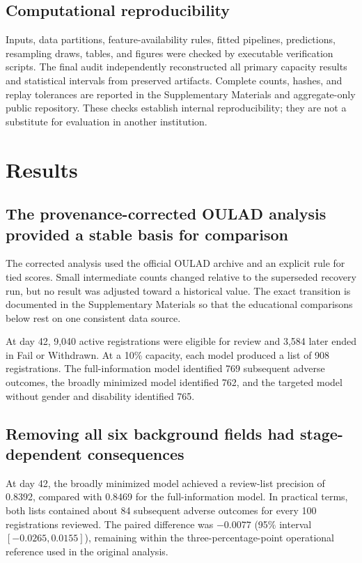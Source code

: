 \documentclass[education,article,submit,moreauthors]{Definitions/mdpi}
\begin{document}
\subsection{Computational reproducibility}

Inputs, data partitions, feature-availability rules, fitted pipelines, predictions, resampling draws, tables, and figures were checked by executable verification scripts. The final audit independently reconstructed all primary capacity results and statistical intervals from preserved artifacts. Complete counts, hashes, and replay tolerances are reported in the Supplementary Materials and aggregate-only public repository. These checks establish internal reproducibility; they are not a substitute for evaluation in another institution.

\section{Results}

\subsection{The provenance-corrected OULAD analysis provided a stable basis for comparison}

The corrected analysis used the official OULAD archive and an explicit rule for tied scores. Small intermediate counts changed relative to the superseded recovery run, but no result was adjusted toward a historical value. The exact transition is documented in the Supplementary Materials so that the educational comparisons below rest on one consistent data source.

At day 42, 9,040 active registrations were eligible for review and 3,584 later ended in Fail or Withdrawn. At a 10\% capacity, each model produced a list of 908 registrations. The full-information model identified 769 subsequent adverse outcomes, the broadly minimized model identified 762, and the targeted model without gender and disability identified 765.

\subsection{Removing all six background fields had stage-dependent consequences}

At day 42, the broadly minimized model achieved a review-list precision of 0.8392, compared with 0.8469 for the full-information model. In practical terms, both lists contained about 84 subsequent adverse outcomes for every 100 registrations reviewed. The paired difference was $-0.0077$ (95\% interval $[-0.0265,0.0155]$), remaining within the three-percentage-point operational reference used in the original analysis.
\end{document}
